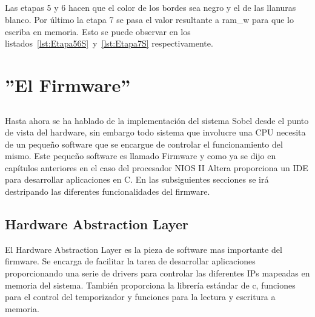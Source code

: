 \documentclass[a4paper,12pt,titlepage,final]{book}
\begin{document}


\paragraph{}
Las etapas 5 y 6 hacen que el color de los bordes sea negro y el de las llanuras blanco. Por último la etapa 7 se pasa el valor resultante a ram\_w para que lo escriba en memoria. Esto se puede observar en los listados~\ref{lst:Etapa56S}~y~\ref{lst:Etapa7S} respectivamente.





\chapter{''El Firmware''}
\section*{}
\subsection*{}
\subsubsection*{}

\paragraph{}
Hasta ahora se ha hablado de la implementación del sistema Sobel desde el punto de vista del hardware, sin embargo todo sistema que involucre una CPU necesita de un pequeño software que se encargue de controlar el funcionamiento del mismo. Este pequeño software es llamado Firmware y como ya se dijo en capítulos anteriores en el caso del procesador NIOS II Altera proporciona un IDE para desarrollar aplicaciones en C. En las subsiguientes secciones se irá destripando las diferentes funcionalidades del firmware.

\section{Hardware Abstraction Layer}
El Hardware Abstraction Layer es la pieza de software mas importante del firmware. Se encarga de facilitar la tarea de desarrollar aplicaciones proporcionando una serie de drivers para controlar las diferentes IPs mapeadas en memoria del sistema. También proporciona la librería estándar de c, funciones para el control del temporizador y funciones para la lectura y escritura a memoria.
\end{document}
